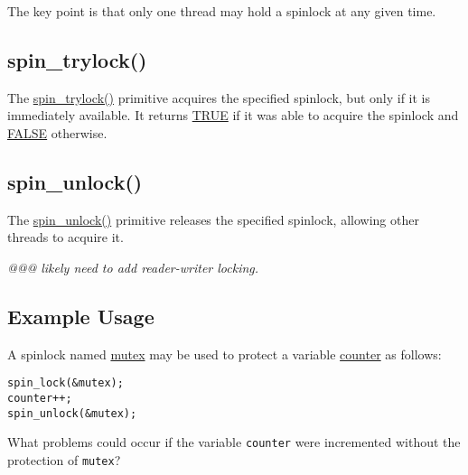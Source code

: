 The key point is that only one thread may hold a spinlock at any
given time.

\subsection{spin\_trylock()}

The \url{spin_trylock()} primitive acquires the specified spinlock,
but only if it is immediately available.
It returns \url{TRUE} if it was able to acquire the spinlock and
\url{FALSE} otherwise.

\subsection{spin\_unlock()}

The \url{spin_unlock()} primitive releases the specified spinlock,
allowing other threads to acquire it.

\emph{@@@ likely need to add reader-writer locking.}

\subsection{Example Usage}

A spinlock named \url{mutex} may be used to protect a variable
\url{counter} as follows:

\vspace{5pt}
\begin{minipage}[t]{\columnwidth}
\small
\begin{verbatim}
spin_lock(&mutex);
counter++;
spin_unlock(&mutex);
\end{verbatim}
\end{minipage}
\vspace{5pt}

\QuickQuiz{}
	What problems could occur if the variable {\tt counter} were
	incremented without the protection of {\tt mutex}?
 \QuickQuizEnd

